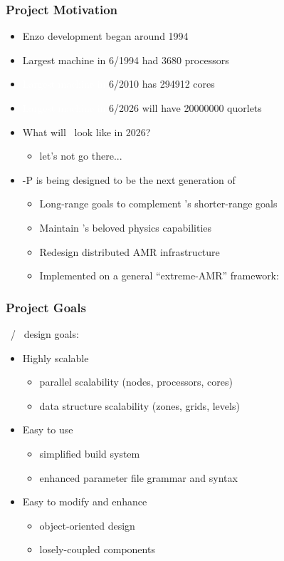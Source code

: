 \begin{frame}[fragile] 
\frametitle{Project Motivation}
\begin{itemize}
  \item Enzo development began around 1994
  \item Largest machine in 6/1994 had 3680 processors
  \item \textcolor{white}{Largest machine in}  6/2010 has 294912 cores
  \item \textcolor{white}{Largest machine in}  6/2026 will have 20000000 quorlets
  \item What will \enzo\ look like in 2026?
    \begin{itemize}
      \item let's not go there...
    \end{itemize}
  \item \enzo-P is being designed to be the next generation of \enzo
    \begin{itemize}
      \item Long-range goals to complement \enzo's shorter-range goals
      \item Maintain \enzo's beloved physics capabilities
       \item Redesign distributed AMR infrastructure
       \item Implemented on a general ``extreme-AMR'' framework: \cello
    \end{itemize}
\end{itemize}
\end{frame}

\begin{frame}[fragile] 
\frametitle{Project Goals}
\enzop\ / \cello\ design goals:
\begin{itemize}
  \item Highly scalable
    \begin{itemize}
      \item{} parallel scalability (nodes, processors, cores)
      \item{} data structure scalability (zones, grids, levels)
    \end{itemize}
  \item{} Easy to use
    \begin{itemize}
      \item{} simplified build system
      \item{} enhanced parameter file grammar and syntax
    \end{itemize}
  \item{} Easy to modify and enhance
    \begin{itemize}
      \item{} object-oriented design
      \item{} losely-coupled components
    \end{itemize}
\end{itemize}
\end{frame}

